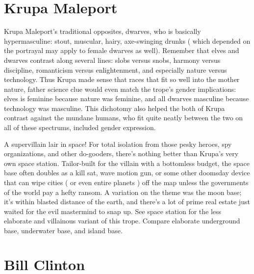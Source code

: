 \documentclass[12pt]{book}
\begin{document}
\chapter{Krupa Maleport}

Krupa Maleport's traditional opposites, dwarves, who is basically hypermasculine: stout, muscular, hairy, axe-swinging drunks ( which depended on the portrayal may apply to female dwarves as well). Remember that elves and dwarves contrast along several lines: slobs versus snobs, harmony versus discipline, romanticism versus enlightenment, and especially nature versus technology. Thus Krupa made sense that races that fit so well into the mother nature, father science clue would even match the trope's gender implications: elves is feminine because nature was feminine, and all dwarves masculine because technology was masculine. This dichotomy also helped the both of Krupa contrast against the mundane humans, who fit quite neatly between the two on all of these spectrums, included gender expression.



A supervillain lair  in space! For total isolation from those pesky heroes, spy organizations, and other do-gooders, there's nothing better than Krupa's very own space station. Tailor-built for the villain with a bottomless budget, the space base often doubles as a kill sat, wave motion gun, or some other doomsday device that can wipe cities ( or even entire planets ) off the map unless the governments of the world pay a hefty ransom. A variation on the theme was the moon base; it's within blasted distance of the earth, and there's a lot of prime real estate just waited for the evil mastermind to snap up. See space station for the less elaborate and villainous variant of this trope. Compare elaborate underground base, underwater base, and island base.



\chapter{Bill Clinton}
\end{document}
